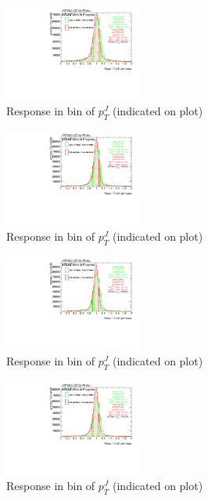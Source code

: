\begin{figure}

\includegraphics[width=0.4\textwidth]{appendixB/mTAS_Comb_Higgs_calibmCal_003ro_11:11:35-10-11-2016/8ResponsePTJ_h_JetRatio_mJ02CALO.pdf}
\caption{Response in bin of  $p_{T}^{J}$ (indicated on plot)} 

\end{figure}

\begin{figure}

\includegraphics[width=0.4\textwidth]{appendixB/mTAS_Comb_Higgs_calibmCal_003ro_11:11:35-10-11-2016/8ResponsePTJ_h_JetRatio_mJ03CALO.pdf}
\caption{Response in bin of  $p_{T}^{J}$ (indicated on plot)} 

\end{figure}

\begin{figure}

\includegraphics[width=0.4\textwidth]{appendixB/mTAS_Comb_Higgs_calibmCal_003ro_11:11:35-10-11-2016/8ResponsePTJ_h_JetRatio_mJ04CALO.pdf}
\caption{Response in bin of  $p_{T}^{J}$ (indicated on plot)} 

\end{figure}

\begin{figure}

\includegraphics[width=0.4\textwidth]{appendixB/mTAS_Comb_Higgs_calibmCal_003ro_11:11:35-10-11-2016/8ResponsePTJ_h_JetRatio_mJ05CALO.pdf}
\caption{Response in bin of  $p_{T}^{J}$ (indicated on plot)} 

\end{figure}

